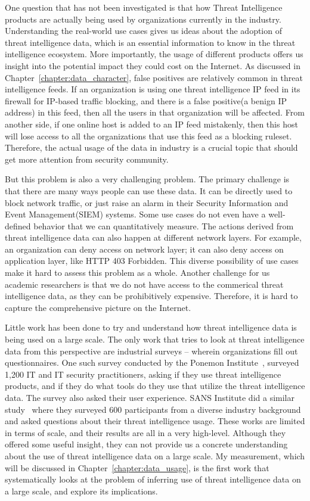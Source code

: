 One question that has not been investigated is that how Threat Intelligence 
products are actually being used by organizations currently in the industry.
Understanding the real-world use cases gives us ideas about the adoption of threat
intelligence data, which is an essential information to know in the threat
intelligence ecosystem. More importantly, the usage of different products offers
us insight into the potential impact they could cost on the Internet. As 
discussed in Chapter~\ref{chapter:data_character}, false positives are relatively 
common in threat intelligence feeds. If an organization is using one threat
intelligence IP feed in its firewall for IP-based traffic blocking, and there
is a false positive(a benign IP address) in this feed, then all the users in
that organization will be affected. From another side, if one online host is
added to an IP feed mistakenly, then this host will lose access to all the
organizations that use this feed as a blocking ruleset. Therefore, the actual
usage of the data in industry is a crucial topic that should get more attention
from security community.

But this problem is also a very challenging problem. The primary challenge 
is that there are many ways people can use these data. It can be directly 
used to block network traffic, or just raise an alarm in their Security
Information and Event Management(SIEM) systems. Some use cases do not even 
have a well-defined behavior that we can quantitatively measure. 
The actions derived from threat intelligence data can also happen at different
network layers. For example, an organization can deny access on network layer; 
it can also deny access on application layer, like HTTP 403 Forbidden. 
This diverse possibility of use cases make it hard to assess this problem as 
a whole. Another challenge for us academic researchers is that we do not have 
access to the commerical threat intelligence data, as they can be prohibitively
expensive. Therefore, it is hard to capture the comprehensive picture on the
Internet.

Little work has been done to try and understand how threat
intelligence data is being used on a large scale. The only work that tries to
look at threat intelligence data from this perspective are industrial surveys
-- wherein organizations fill out questionnaires. One such survey conducted by
the Ponemon Institute~\cite{ponemon2018cti}, surveyed 1,200 IT and IT
security practitioners, asking if they use threat intelligence products, and
if they do what tools do they use that utilize the threat intelligence data.
The survey also asked their user experience. SANS Institute did a
similar study~\cite{shackleford2017cyber} where they surveyed 600
participants from a diverse industry background and asked questions about
their threat intelligence usage. These works are limited in terms
of scale, and their results are all in a very high-level. Although they offered
some useful insight, they can not provide us a concrete understanding
about the use of threat intelligence data on a large scale. My measurement,
which will be discussed in Chapter~\ref{chapter:data_usage},
is the first work that systematically looks at the problem of inferring use
of threat intelligence data on a large scale, and explore its implications.
